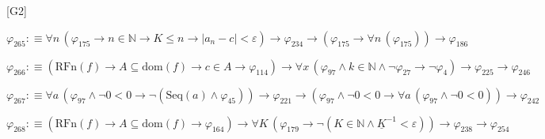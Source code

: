 \begin{fullproof}{[G2]}
\begin{abbrevlist}
\item $\varphi_{265} :\equiv \forall n\,(\varphi_{175} \to n \in \mathbb{N} \to K \leq n \to \lvert a_{n} - c \rvert < \varepsilon) \to \varphi_{234} \to (\varphi_{175} \to \forall n\,(\varphi_{175})) \to \varphi_{186}$
\item $\varphi_{266} :\equiv (\mathrm{RFn}(f) \to A \subseteq \mathrm{dom}(f) \to c \in A \to \varphi_{114}) \to \forall x\,(\varphi_{97} \land k \in \mathbb{N} \land \neg \varphi_{27} \to \neg \varphi_{4}) \to \varphi_{225} \to \varphi_{246}$
\item $\varphi_{267} :\equiv \forall a\,(\varphi_{97} \land \neg 0 < 0 \to \neg (\mathrm{Seq}(a) \land \varphi_{45})) \to \varphi_{221} \to (\varphi_{97} \land \neg 0 < 0 \to \forall a\,(\varphi_{97} \land \neg 0 < 0)) \to \varphi_{242}$
\item $\varphi_{268} :\equiv (\mathrm{RFn}(f) \to A \subseteq \mathrm{dom}(f) \to \varphi_{164}) \to \forall K\,(\varphi_{179} \to \neg (K \in \mathbb{N} \land \underline{K}^{-1} < \varepsilon)) \to \varphi_{238} \to \varphi_{254}$
\end{abbrevlist}
\end{fullproof}
